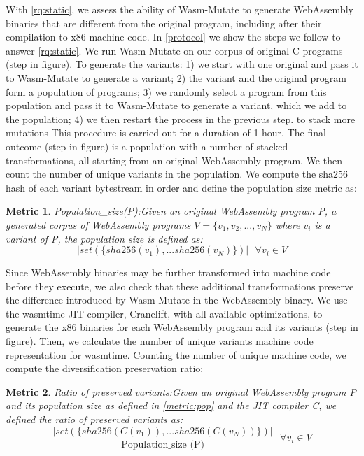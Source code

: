 \documentclass[a4paper,fleqn]{cas-dc}
\newcommand{\tool}{{\sc Wasm-Mutate}\xspace}
\newcommand{\Wasm}{WebAssembly\xspace}
\newcommand{\wasm}{\Wasm}
\newtheorem{metric}{Metric}
\newcommand*\step[1]{
\noindent\tikz[baseline=(char.base)]{
        \node[shape=circle,text=black,draw=black, fill=white,inner sep=1.2pt] (char) {#1};}}
\begin{document}
With \ref{rq:static},
we assess the ability of \tool to generate \Wasm binaries that are different from the original program, including after their compilation to x86 machine code.
In \autoref{protocol} we show the steps we follow to answer \ref{rq:static}.
We run \tool on our corpus of \nProgramsRosetta{} original C programs (step \step{1} in figure). 
To generate the variants:
1) we start with one original and pass it to \tool to generate a variant;  
2) the variant and the original program form a population of programs; 
3) we randomly select a program from this population and pass it to \tool to generate a variant, which we add to the population; 
4) we then restart the process in the previous step. to stack more mutations 
This procedure is carried out for a duration of 1 hour.
The final outcome (step \step{2} in figure) is a population with a number of stacked transformations, all starting from an original \wasm program.
We then count the number of unique variants in the population.
We compute the sha256 hash of each variant bytestream in order and define the population size metric as: 


\begin{metric}{Population\_size(P):}\label{metric:pop}
Given an original \wasm program P, a generated corpus of \wasm programs $V=\{v_1, v_2, ..., v_N\}$ where $v_i$ is a variant of P, the population size is defined as:
$$
    | set(\{ sha256(v_1), ... sha256(v_N) \})|\text{ }\forall v_i \in V 
$$
\end{metric}


Since \wasm binaries may be further transformed into machine code before they execute, we also check that these additional transformations preserve the difference introduced by \tool in the \wasm binary. 
We use the wasmtime JIT compiler, Cranelift, with all available optimizations, to generate the x86 binaries for each \wasm program and its variants  (step \step{3} in figure). 
Then, we calculate the number of unique variants machine code representation for wasmtime.
Counting the number of unique machine code, we compute the diversification preservation ratio: \\

\begin{metric}{Ratio of preserved variants:}\label{metric:preservation}
    Given an original \wasm program P and its population size as defined in \autoref{metric:pop} and the JIT compiler C, we defined the ratio of preserved variants as:
    $$
        \frac{ | set(\{ sha256(C(v_1)), ... sha256(C(v_N)) \})|}{ \text{Population\_size (P)}} \text{ }\forall v_i \in V 
    $$

    
\end{metric}
\end{document}
